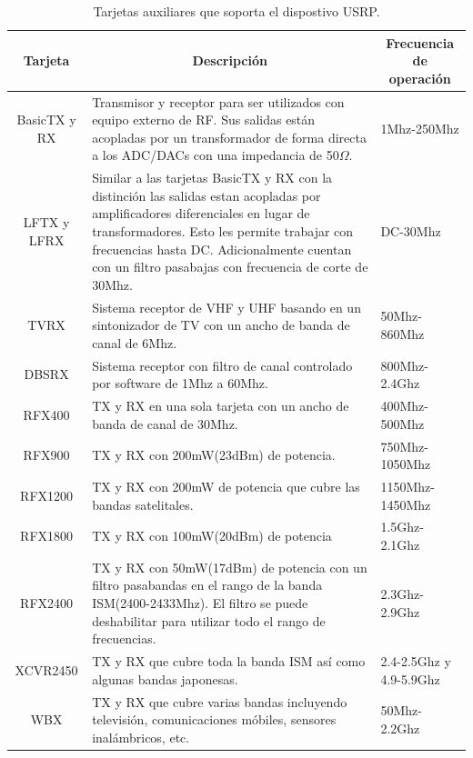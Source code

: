 \begin{table}[htp]
\begin{center}
	\begin{tabular}{|c|p{8cm}|p{3cm}|}
		\hline
		\multicolumn{1}{|c|}{Tarjeta} & \multicolumn{1}{|c|}{Descripci\'on} & \multicolumn{1}{|c|}{Frecuencia de operaci\'on}\\
		\hline
		BasicTX y RX & Transmisor y receptor para ser utilizados con equipo externo de RF. Sus salidas
		est\'an acopladas por un transformador de forma directa a los ADC/DACs con una impedancia de 50$\Omega$.
		& 1Mhz-250Mhz\\
		\hline
		LFTX y LFRX & Similar a las tarjetas BasicTX y RX con la distinci\'on las salidas estan acopladas por amplificadores
		diferenciales en lugar de transformadores. Esto les permite trabajar con frecuencias hasta DC.
		Adicionalmente cuentan con un filtro pasabajas con frecuencia de corte de 30Mhz. & DC-30Mhz\\
		\hline
		TVRX & Sistema receptor de VHF y UHF basando en un sintonizador de TV con un ancho de banda de
		canal de 6Mhz. & 50Mhz-860Mhz\\
		\hline
		DBSRX & Sistema receptor con filtro de canal controlado por software de 1Mhz a 60Mhz. &
		800Mhz-2.4Ghz\\
		\hline
		RFX400 & TX y RX en una sola tarjeta con un ancho de banda de canal de 30Mhz. & 400Mhz-500Mhz\\
		\hline
		RFX900 & TX y RX con 200mW(23dBm) de potencia.  & 750Mhz-1050Mhz\\
		\hline
		RFX1200 & TX y RX con 200mW de potencia que cubre las bandas satelitales. & 1150Mhz-1450Mhz\\
		\hline
		RFX1800 & TX y RX con 100mW(20dBm) de potencia & 1.5Ghz-2.1Ghz\\
		\hline
		RFX2400 & TX y RX con 50mW(17dBm) de potencia con un filtro pasabandas en el rango de la banda
		ISM(2400-2433Mhz). El filtro se puede deshabilitar para utilizar todo el rango de frecuencias. &
		2.3Ghz-2.9Ghz\\
		\hline
		XCVR2450 & TX y RX que cubre toda la banda ISM as\'i como algunas bandas japonesas. &
		2.4-2.5Ghz y 4.9-5.9Ghz\\
		\hline
		WBX & TX y RX que cubre varias bandas incluyendo televisi\'on, comunicaciones m\'obiles, sensores
		inal\'ambricos, etc. & 50Mhz-2.2Ghz\\
		\hline
	\end{tabular}
	\vspace{0.5in}
	\caption{Tarjetas auxiliares que soporta el dispostivo USRP.}
	\label{tbl:cards}
\end{center}
\end{table}

